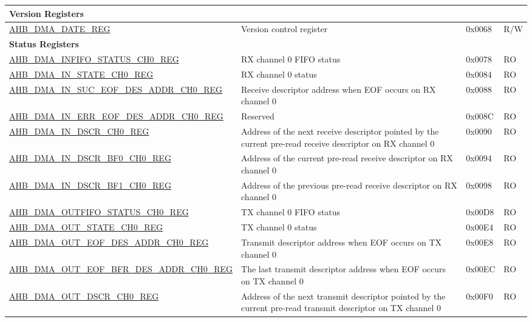 \begin{longtable}{ | p{8cm} | p{8cm} | p{1.3cm} | p{1.5cm} | }
\multicolumn{4}{|l|}{\textbf{Version Registers}} \\ \hline
\hyperref[regdesc:AHBDMADATEREG]{AHB\_DMA\_DATE\_REG} & Version control register & 0x0068 & R/W \\ \hline
\multicolumn{4}{|l|}{\textbf{Status Registers}} \\ \hline
\hyperref[regdesc:AHBDMAINFIFOSTATUSCHNREG]{AHB\_DMA\_INFIFO\_STATUS\_CH0\_REG} & RX channel 0 FIFO status & 0x0078 & RO \\ \hline
\hyperref[regdesc:AHBDMAINSTATECHNREG]{AHB\_DMA\_IN\_STATE\_CH0\_REG} & RX channel 0 status & 0x0084 & RO \\ \hline
\hyperref[regdesc:AHBDMAINSUCEOFDESADDRCHNREG]{AHB\_DMA\_IN\_SUC\_EOF\_DES\_ADDR\_CH0\_REG} & Receive descriptor address when EOF occurs on RX channel 0 & 0x0088 & RO \\ \hline
\hyperref[regdesc:AHBDMAINERREOFDESADDRCH0REG]{AHB\_DMA\_IN\_ERR\_EOF\_DES\_ADDR\_CH0\_REG} & Reserved & 0x008C & RO \\ \hline
\hyperref[regdesc:AHBDMAINDSCRCHNREG]{AHB\_DMA\_IN\_DSCR\_CH0\_REG} & Address of the next receive descriptor pointed by the current pre-read receive descriptor on RX channel 0 & 0x0090 & RO \\ \hline
\hyperref[regdesc:AHBDMAINDSCRBF0CHNREG]{AHB\_DMA\_IN\_DSCR\_BF0\_CH0\_REG} & Address of the current pre-read receive descriptor on RX channel 0 & 0x0094 & RO \\ \hline
\hyperref[regdesc:AHBDMAINDSCRBF1CHNREG]{AHB\_DMA\_IN\_DSCR\_BF1\_CH0\_REG} & Address of the previous pre-read receive descriptor on RX channel 0 & 0x0098 & RO \\ \hline
\hyperref[regdesc:AHBDMAOUTFIFOSTATUSCHNREG]{AHB\_DMA\_OUTFIFO\_STATUS\_CH0\_REG} & TX channel 0 FIFO status & 0x00D8 & RO \\ \hline
\hyperref[regdesc:AHBDMAOUTSTATECHNREG]{AHB\_DMA\_OUT\_STATE\_CH0\_REG} & TX channel 0 status & 0x00E4 & RO \\ \hline
\hyperref[regdesc:AHBDMAOUTEOFDESADDRCHNREG]{AHB\_DMA\_OUT\_EOF\_DES\_ADDR\_CH0\_REG} & Transmit descriptor address when EOF occurs on TX channel 0 & 0x00E8 & RO \\ \hline
\hyperref[regdesc:AHBDMAOUTEOFBFRDESADDRCHNREG]{AHB\_DMA\_OUT\_EOF\_BFR\_DES\_ADDR\_CH0\_REG} & The last transmit descriptor address when EOF occurs on TX channel 0 & 0x00EC & RO \\ \hline
\hyperref[regdesc:AHBDMAOUTDSCRCHNREG]{AHB\_DMA\_OUT\_DSCR\_CH0\_REG} & Address of the next transmit descriptor pointed by the current pre-read transmit descriptor on TX channel 0 & 0x00F0 & RO \\ \hline

\end{longtable}
